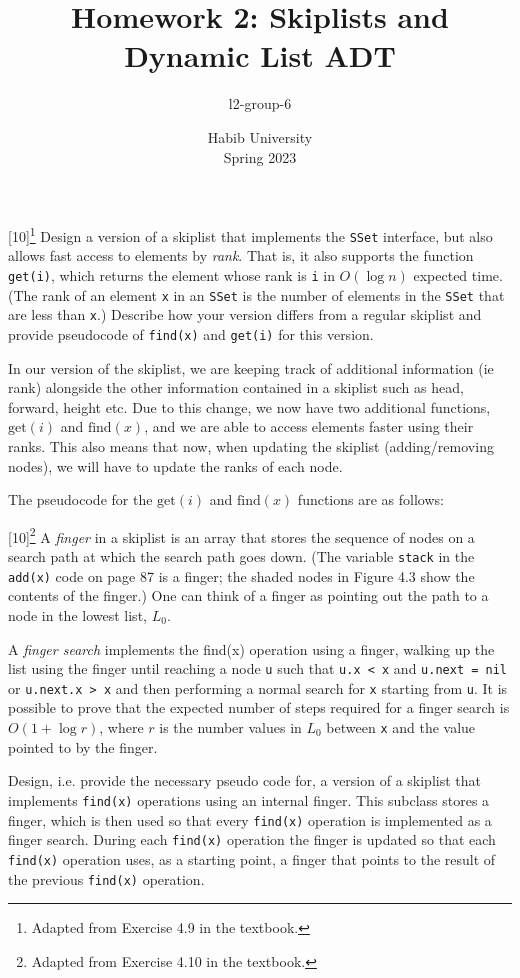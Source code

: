 \documentclass[addpoints]{exam}
\title{Homework 2: Skiplists and Dynamic List ADT}
\author{l2-group-6}  %
\date{Habib University\\Spring 2023}
\begin{document}
\begin{questions}

  [10]\footnote{Adapted from Exercise 4.9 in the textbook.}
  Design a version of a skiplist that implements the \texttt{SSet} interface, but also allows fast access to elements by \textit{rank}. That is, it also supports the function \texttt{get(i)}, which returns the element whose rank is \texttt{i} in $O(\log n)$ expected time. (The rank of an element \texttt{x} in an \texttt{SSet} is the number of elements in the \texttt{SSet} that are less than \texttt{x}.)
  Describe how your version differs from a regular skiplist and provide pseudocode of \texttt{find(x)} and \texttt{get(i)} for this version.
  \begin{solution}
    In our version of the skiplist, we are keeping track of additional information (ie rank) alongside the other information contained in a skiplist such as head, forward, height etc. Due to this change, we now have two additional functions, $\text{get}(i)$ and $\text{find}(x)$, and we are able to access elements faster using their ranks. This also means that now, when updating the skiplist (adding/removing nodes), we will have to update the ranks of each node.
    \par The pseudocode for the $\text{get}(i)$ and $\text{find}(x)$ functions are as follows:
  \end{solution}

  [10]\footnote{Adapted from Exercise 4.10 in the textbook.}
  A \textit{finger} in a skiplist is an array that stores the sequence of nodes on a search path at which the search path goes down. (The variable \texttt{stack} in the \texttt{add(x)} code on page 87 is a finger; the shaded nodes in Figure 4.3 show the contents of the finger.) One can think of a finger as pointing out the path to a node in the lowest list, $L_0$.

  A \textit{finger search} implements the find(x) operation using a finger, walking up the list using the finger until reaching a node \texttt{u} such that \texttt{u.x < x} and \texttt{u.next = nil} or \texttt{u.next.x > x} and then performing a normal search for \texttt{x} starting from \texttt{u}. It is possible to prove that the expected number of steps required for a finger search is $O(1+\log r)$, where $r$ is the number values in $L_0$ between \texttt{x} and the value pointed to by the finger.

  Design, i.e. provide the necessary pseudo code for, a version of a skiplist that implements \texttt{find(x)} operations using an internal finger. This subclass stores a finger, which is then used so that every \texttt{find(x)} operation is implemented as a finger search. During each \texttt{find(x)} operation the finger is updated so that each \texttt{find(x)} operation uses, as a starting point, a finger that points to the result of the previous \texttt{find(x)} operation.
  \begin{solution}
  \end{solution}


\end{questions}
\end{document}
